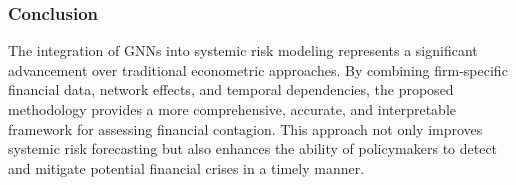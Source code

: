 \documentclass[preprint,12pt,authoryear]{elsarticle}
\begin{document}
\subsubsection{Conclusion}  

The integration of GNNs into systemic risk modeling represents a significant advancement over traditional econometric approaches. By combining firm-specific financial data, network effects, and temporal dependencies, the proposed methodology provides a more comprehensive, accurate, and interpretable framework for assessing financial contagion. This approach not only improves systemic risk forecasting but also enhances the ability of policymakers to detect and mitigate potential financial crises in a timely manner.



\end{document}
